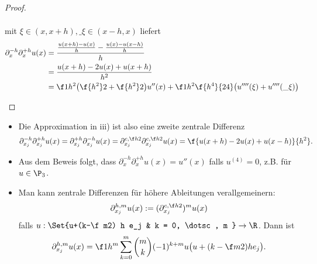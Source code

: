 \begin{st}[Approximationsgüte]
\begin{proof}
\begin{enumerate}[i)]
\begin{align*}
				\end{align*}
				mit $\xi \in (x,x+h), \_\xi \in (x-h, x)$ liefert
				\begin{align*}
					\partial_x^{-h} \partial_x^{+h} u(x)
					&= \dfrac{\frac{u(x+h)-u(x)}{h}-\frac{u(x)-u(x-h)}{h}}{h} \\
					&= \frac{u(x+h) - 2u(x) +  u(x+h)}{h^2} \\
					&= \f 1{h^2} \big( \f {h^2}2 + \f {h^2}2 \big) u''(x) + \f 1{h^2} \f {h^4}{24} \big( u''''(\xi) + u''''(\_\xi) \big)
				\end{align*}
		\end{enumerate}
	\end{proof}
	\begin{note}
		\begin{itemize}
			\item
				Die Approximation in iii) ist also eine zweite zentrale Differenz
				\[
					\partial_{x_j}^{-h} \partial_{x_j}^{+h} u(x)
					= \partial_{x_j}^{+h} \partial_{x_j}^{-h} u(x)
					= \partial_{x_j}^{c, \f h2} \partial_{x_j}^{c, \f h2} u(x)
					= \f{u(x+h) - 2u(x) + u(x-h)}{h^2}.
				\]
			\item
				Aus dem Beweis folgt, dass $\partial_x^{-h} \partial_{x}^{+h} u(x) = u''(x)$ falls $u^{(4)} = 0$, z.B. für $u \in \P_3$.
			\item
				Man kann zentrale Differenzen für höhere Ableitungen verallgemeinern:
				\[
					\partial_{x_j}^{h,m} u(x)
					:= (\partial_{x_{j}}^{c, \f h2})^m u(x)
				\]
				falls $u: \Set{u+(k-\f m2) h e_j & k = 0, \dotsc, m } \to \R$.
				Dann ist
				\[
					\partial_{x_j}^{h,m} u(x)
					= \f 1{h^m} \sum_{k=0}^m \binom{m}{k} (-1)^{k+m} u\big( u + (k-\f m2) h e_j \big).
				\]
		\end{itemize}
	\end{note}
\end{st}

